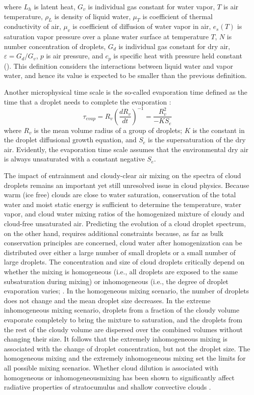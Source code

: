 where $L_h$ is latent heat, $G_v$ is individual gas constant for water vapor,
$T$ is air temperature, $\rho_L$ is density of liquid water, $\mu_T$ is coefficient
of thermal conductivity of air, $\mu_v$ is coefficient of diffusion of water vapor
in air, $e_s(T)$ is saturation vapor pressure over a plane water surface at
temperature $T$, $N$ is number concentration of droplets, $G_d$ is individual
gas constant for dry air, $\varepsilon = G_d/G_v$, $p$ is air pressure, and
$c_p$ is specific heat with pressure held constant (\cite{Lu2011}).
This definition considers the interactions between liquid water and vapor water, 
and hence its value is expected to be smaller than the previous definition. 

Another microphysical time scale is the so-called evaporation time defined as the time that a droplet needs to complete the evaporation \cite{Andrejczuk2009, Burnet2007Observational}:
\begin{equation}
\tau_{evap} = R_v(\frac{dR_v}{dt})^{-1} = \frac{R_v^2}{-KS_e}
\end{equation}
where $R_v$ is the mean volume radius of a group of droplets; $K$ is the constant in the 
droplet diffusional growth equation, and $S_e$ is the supersaturation of the dry air.
Evidently, the evaporation time scale assumes that the environmental dry air is always 
unsaturated with a constant negative $S_e$.
 
The impact of entrainment and cloudy-clear air mixing on the spectra of cloud droplets remains an important yet still unresolved issue in cloud physics. Because warm (ice free)
clouds are close to water saturation, conservation of the total water and moist static energy is sufficient to determine the temperature, water vapor, and cloud water mixing ratios of the homogenized mixture of cloudy and cloud-free unsaturated air. Predicting the evolution of a cloud droplet spectrum, on the other hand, requires additional constraints because, as far as bulk conservation principles are concerned, cloud water after homogenization can be distributed over either a large number of small droplets or a small number of large droplets. The concentration and size of cloud droplets critically depend on whether the mixing is homogeneous (i.e., all droplets are exposed to the same subsaturation during mixing) or inhomogeneous (i.e., the degree of droplet evaporation varies; \cite{Baker1979, Baker1980, Burnet2007Observational}. In the homogeneous mixing scenario, the number of droplets does not change and the mean droplet size decreases. In the extreme inhomogeneous mixing scenario, droplets from a fraction of the cloudy volume evaporate completely to bring the mixture to saturation, and the droplets from the rest of the cloudy volume are dispersed over the combined volumes without
changing their size. It follows that the extremely inhomogeneous mixing is associated with the change of droplet concentration, but not the droplet size. The homogeneous mixing and the extremely inhomogeneous mixing set the limits for all possible mixing scenarios. Whether cloud dilution is associated with homogeneous or inhomogeneousmixing has been shown to significantly affect radiative properties of stratocumulus \cite{Chosson2007} and shallow convective clouds \cite{Grabowski2006, Slawinska2008}.

